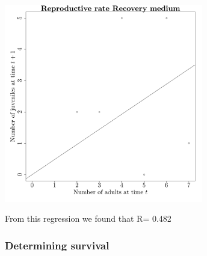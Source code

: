\documentclass{article}\usepackage[]{graphicx}\usepackage[]{color}
\begin{document}
{\centering \includegraphics[width=0.65\textwidth]{figure/k512} 

}



 From this regression we found that R= 0.482 

\subsubsection{Determining survival}
\end{document}

